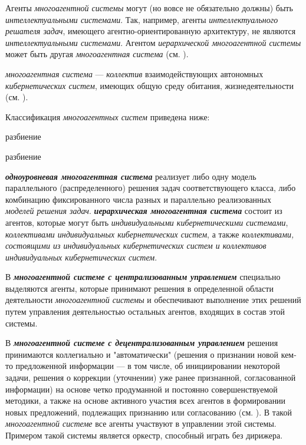 Агенты \textit{многоагентной системы} могут (но вовсе не обязательно должны) быть \textit{интеллектуальными системами}. 
Так, например, агенты \textit{интеллектуального решателя задач}, имеющего агентно-ориентированную архитектуру, не являются \textit{интеллектуальными системами}. Агентом \textit{иерархической многоагентной системы} может быть другая \textit{многоагентная система} (см. ).

\textit{многоагентная система} --- \textit{коллектив} взаимодействующих автономных \textit{кибернетических систем}, имеющих общую среду обитания, жизнедеятельности (см. ). 

Классификация \textit{многоагентных систем} приведена ниже:

\begin{SCn}
\begin{scnrelfromset}{разбиение}
\end{scnrelfromset}
\begin{scnrelfromset}{разбиение}
\end{scnrelfromset}
\end{SCn}

\textbf{\textit{одноуровневая многоагентная система}} реализует либо одну модель параллельного (распределенного) решения задач соответствующего класса, либо комбинацию фиксированного числа разных и параллельно реализованных \textit{моделей решения задач}. 
\textbf{\textit{иерархическая многоагентная система}} состоит из агентов, которые могут быть \textit{индивидуальными кибернетическими системами}, \textit{коллективами индивидуальных кибернетических систем}, а также \textit{коллективами, состоящими из индивидуальных кибернетических систем и коллективов индивидуальных кибернетических систем}.

В \textbf{\textit{многоагентной системе с централизованным управлением}} специально выделяются агенты, которые принимают решения в определенной области деятельности \textit{многоагентной системы} и обеспечивают выполнение этих решений путем управления деятельностью остальных агентов, входящих в состав этой системы.

В \textbf{\textit{многоагентной системе с децентрализованным управлением}} решения принимаются коллегиально и "автоматически"{} (решения о признании новой кем-то предложенной информации --- в том числе, об инициировании некоторой задачи, решения о коррекции (уточнении) уже ранее признанной, согласованной информации) на основе четко продуманной и постоянно совершенствуемой методики, а также на основе активного участия всех агентов в формировании новых предложений, подлежащих признанию или согласованию (см. ). 
В такой \textit{многоагентной системе} все агенты участвуют в управлении этой системы. 
Примером такой системы является оркестр, способный играть без дирижера.



